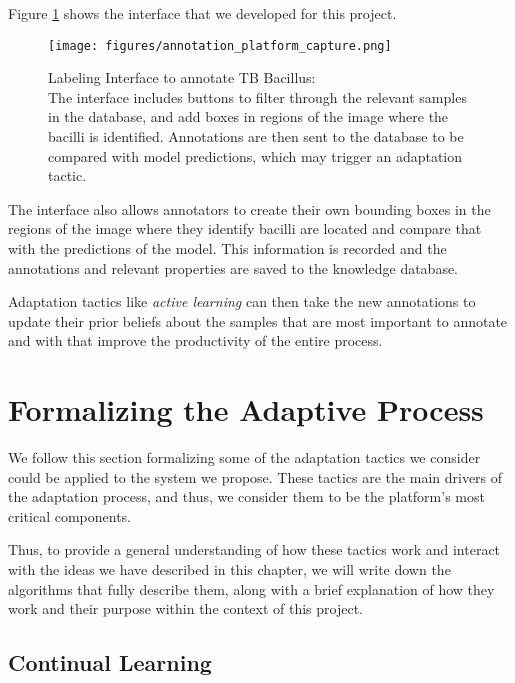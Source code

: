 \documentclass[../main.tex]{subfiles}
\begin{document}
   Figure \ref{fig:labeling_interface} shows the interface that we developed for this project.

   \begin{figure}
       \centering
       \texttt{[image: figures/annotation\_platform\_capture.png]}
       \caption{Labeling Interface to annotate TB Bacillus:\\\footnotesize The interface includes buttons to filter through the relevant samples in the database, and add boxes in regions of the image where the bacilli is identified. Annotations are then sent to the database to be compared with model predictions, which may trigger an adaptation tactic.}
       \label{fig:labeling_interface}
   \end{figure}

   The interface also allows annotators to create their own bounding boxes in the regions of the image where they identify bacilli are located and compare that with the predictions of the model. This information is recorded and the annotations and relevant properties are saved to the knowledge database.

   Adaptation tactics like \textit{active learning} can then take the new annotations to update their prior beliefs about the samples that are most important to annotate and with that improve the productivity of the entire process.


    \section{Formalizing the Adaptive Process} \label{sec:formalizing_adaptive_process}


    We follow this section formalizing some of the adaptation tactics we consider could be applied to the system we propose. These tactics are the main drivers of the adaptation process, and thus, we consider them to be the platform's most critical components.

    Thus, to provide a general understanding of how these tactics work and interact with the ideas we have described in this chapter, we will write down the algorithms that fully describe them, along with a brief explanation of how they work and their purpose within the context of this project.

    
    
    \subsection{Continual Learning}
    \vspace{-0.45cm}
    
\end{document}
